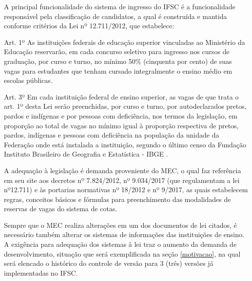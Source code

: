  A principal funcionalidade do sistema de ingresso do \gls{IFSC} é a funcionalidade responsável pela classificação de candidatos, a qual é construída e mantida conforme critérios da Lei nº 12.711/2012, que estabelece:
 \begin{citacao}
 Art. 1º As instituições federais de educação superior vinculadas ao Ministério da Educação reservarão, em cada concurso seletivo para ingresso nos cursos de graduação, por curso e turno, no mínimo 50\% (cinquenta por cento) de suas vagas para estudantes que tenham cursado integralmente o ensino médio em escolas públicas.
 
 Art. 3º Em cada instituição federal de ensino superior, as vagas de que trata o art. 1º desta Lei serão preenchidas, por curso e turno, por autodeclarados pretos, pardos e indígenas e por pessoas com deficiência, nos termos da legislação, em proporção ao total de vagas no mínimo igual à proporção respectiva de pretos, pardos, indígenas e pessoas com deficiência na população da unidade da Federação onde está instalada a instituição, segundo o último censo da Fundação Instituto Brasileiro de Geografia e Estatística - IBGE \cite{leicotas}.  
 \end{citacao}
 
 A adequação à legislação é demanda proveniente do \gls{MEC}, o qual faz referência em seu site aos decretos nº 7.824/2012, nº 9.034/2017 (que regulamentam a lei nº12.711) e às portarias normativas nº 18/2012 e nº 9/2017, as quais estabelecem regras, conceitos básicos e fórmulas para preenchimento das modalidades de reservas de vagas do sistema de cotas. 
 
 Sempre que o \gls{MEC} realiza alterações em um dos documentos de lei citados, é necessário também alterar os sistemas de informações das instituições de ensino. A exigência para adequação dos sistemas à lei traz o aumento da demanda de desenvolvimento, situação que será exemplificada na seção \ref{motivacao}, na qual será elencado o histórico do controle de versão para 3 (três) versões já implementadas no \gls{IFSC}.
 
 

 
 